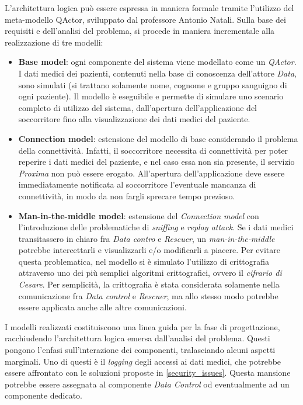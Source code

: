 \documentclass[a4paper,12pt]{report}
\begin{document}
L'architettura logica può essere espressa in maniera formale tramite l’utilizzo del meta-modello
QActor, sviluppato dal professore Antonio Natali. Sulla base dei requisiti e dell'analisi del problema, si procede in maniera incrementale alla realizzazione di tre modelli:
\begin{itemize}
	\item \textbf{Base model}: ogni componente del sistema viene modellato come un \emph{QActor}. I dati medici dei pazienti, contenuti nella base di conoscenza dell'attore \emph{Data}, sono simulati (si trattano solamente nome, cognome e gruppo sanguigno di ogni paziente). Il modello è eseguibile e permette di simulare uno scenario completo di utilizzo del sistema, dall'apertura dell'applicazione del soccorritore fino alla visualizzazione dei dati medici del paziente.
	\item \textbf{Connection model}: estensione del modello di base considerando il problema della connettività. Infatti, il soccorritore necessita di connettività per poter reperire i dati medici del paziente, e nel caso essa non sia presente, il servizio \emph{Proxima} non può essere erogato. All'apertura dell'applicazione deve essere immediatamente notificata al soccorritore l'eventuale mancanza di connettività, in modo da non fargli sprecare tempo prezioso.
	\item \textbf{Man-in-the-middle model}: estensione del \emph{Connection model} con l'introduzione delle problematiche di \emph{sniffing} e \emph{replay attack}. Se i dati medici transitassero in chiaro fra \emph{Data contro} e \emph{Rescuer}, un \emph{man-in-the-middle} potrebbe intercettarli e visualizzarli e/o modificarli a piacere. Per evitare questa problematica, nel modello si è simulato l'utilizzo di crittografia attraverso uno dei più semplici algoritmi crittografici, ovvero il \emph{cifrario di Cesare}. Per semplicità, la crittografia è stata considerata solamente nella comunicazione fra \emph{Data control} e \emph{Rescuer}, ma allo stesso modo potrebbe essere applicata anche alle altre comunicazioni.
\end{itemize}

I modelli realizzati costituiscono una linea guida per la fase di progettazione, racchiudendo l'architettura logica emersa dall'analisi del problema. Questi pongono l'enfasi sull'interazione dei componenti, tralasciando alcuni aspetti marginali. Uno di questi è il \emph{logging} degli accessi ai dati medici, che potrebbe essere affrontato con le soluzioni proposte in \autoref{security_issues}. Questa mansione potrebbe essere assegnata al componente \emph{Data Control} od eventualmente ad un componente dedicato. 
\end{document}
